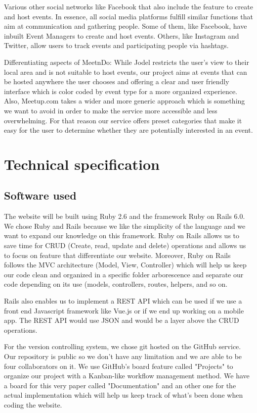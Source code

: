 \documentclass[conference]{IEEEtran}
\begin{document}
Various other social networks like Facebook that also include the feature to create and host events.
In essence, all social media platforms fulfill similar functions that aim at communication and gathering people.
Some of them, like Facebook, have inbuilt Event Managers to create and host events.
Others, like Instagram and Twitter, allow users to track events and participating people via hashtags.

Differentiating aspects of MeetnDo: While Jodel restricts the user’s view to their local area and is not suitable to host events, our project aims at events that can be hosted anywhere the user chooses and offering a clear and user friendly interface which is color coded by event type for a more organized experience.
Also, Meetup.com takes a wider and more generic approach which is something we want to avoid in order to make the service more accessible and less overwhelming.
For that reason our service offers preset categories that make it easy for the user to determine whether they are potentially interested in an event.

\section{Technical specification}

\subsection{Software used}

The website will be built using Ruby 2.6 and the framework Ruby on Rails 6.0. We chose Ruby and Rails because we like the simplicity of the language and we want to expand our knowledge on this framework.
Ruby on Rails allows us to save time for CRUD (Create, read, update and delete) operations and allows us to focus on feature that differentiate our website.
Moreover, Ruby on Rails follows the MVC architecture (Model, View, Controller) which will help us keep our code clean and organized in a specific folder arborescence and separate our code depending on its use (models, controllers, routes, helpers, and so on.

Rails also enables us to implement a REST API which can be used if we use a front end Javascript framework like Vue.js or if we end up working on a mobile app.
The REST API would use JSON and would be a layer above the CRUD operations.

For the version controlling system, we chose git hosted on the GitHub service.
Our repository is public so we don't have any limitation and we are able to be four collaborators on it.
We use GitHub's board feature called "Projects" to organize our project with a Kanban-like workflow management method.
We have a board for this very paper called "Documentation" and an other one for the actual implementation which will help us keep track of what's been done when coding the website.
\end{document}
